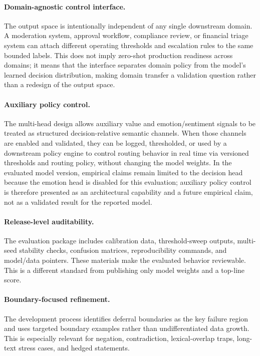 \documentclass[11pt]{article}
\begin{document}
\paragraph{Domain-agnostic control interface.}
The output space is intentionally independent of any single downstream domain. A moderation system, approval workflow, compliance review, or financial triage system can attach different operating thresholds and escalation rules to the same bounded labels. This does not imply zero-shot production readiness across domains; it means that the interface separates domain policy from the model's learned decision distribution, making domain transfer a validation question rather than a redesign of the output space.

\paragraph{Auxiliary policy control.}
The multi-head design allows auxiliary value and emotion/sentiment signals to be treated as structured decision-relative semantic channels. When those channels are enabled and validated, they can be logged, thresholded, or used by a downstream policy engine to control routing behavior in real time via versioned thresholds and routing policy, without changing the model weights. In the evaluated model version, empirical claims remain limited to the decision head because the emotion head is disabled for this evaluation; auxiliary policy control is therefore presented as an architectural capability and a future empirical claim, not as a validated result for the reported model.

\paragraph{Release-level auditability.}
The evaluation package includes calibration data, threshold-sweep outputs, multi-seed stability checks, confusion matrices, reproducibility commands, and model/data pointers. These materials make the evaluated behavior reviewable. This is a different standard from publishing only model weights and a top-line score.

\paragraph{Boundary-focused refinement.}
The development process identifies deferral boundaries as the key failure region and uses targeted boundary examples rather than undifferentiated data growth. This is especially relevant for negation, contradiction, lexical-overlap traps, long-text stress cases, and hedged statements.
\end{document}
